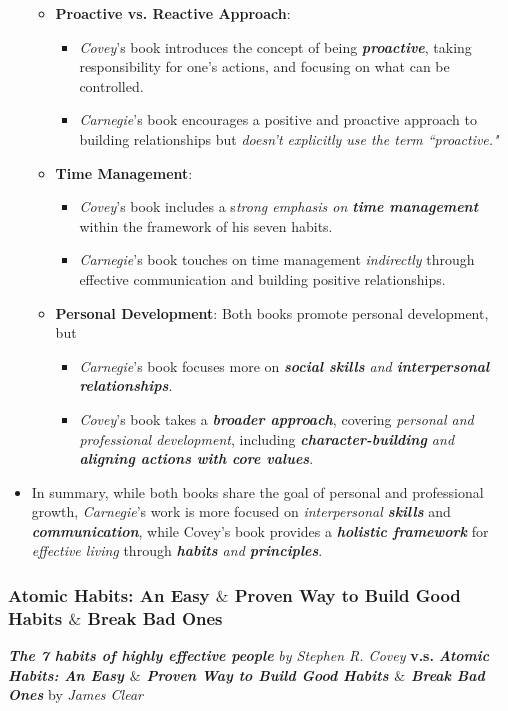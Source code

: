 \documentclass[11pt]{article}
\begin{document}
\begin{itemize}
\begin{itemize}
\item \textbf{Proactive vs. Reactive Approach}:
\begin{itemize}
\item \emph{Covey}'s book introduces the concept of being \emph{\textbf{proactive}}, taking responsibility for one's actions, and focusing on what can be controlled.
\item \emph{Carnegie}'s book encourages a positive and proactive approach to building relationships but \emph{doesn't explicitly use the term ``proactive."}
\end{itemize}

\item \textbf{Time Management}:
\begin{itemize}
\item \emph{Covey}'s book includes a s\emph{trong emphasis on \textbf{time management}} within the framework of his seven habits.
\item \emph{Carnegie}'s book touches on time management \emph{indirectly} through effective communication and building positive relationships.
\end{itemize}

\item \textbf{Personal Development}: Both books promote personal development, but 
\begin{itemize}
\item \emph{Carnegie}'s book focuses more on \emph{\textbf{social skills} and \textbf{interpersonal relationships}}.
\item \emph{Covey}'s book takes a \emph{\textbf{broader approach}}, covering \emph{personal and professional development}, including \emph{\textbf{character-building} and \textbf{aligning actions with core values}}.
\end{itemize}
\end{itemize}

\item In summary, while both books share the goal of personal and professional growth, \emph{Carnegie}'s work is more focused on \emph{interpersonal \textbf{skills}} and \emph{\textbf{communication}}, while Covey's book provides a \emph{\textbf{holistic framework}} for \emph{effective living} through \emph{\textbf{habits} and \textbf{principles}}.
\end{itemize}

\subsubsection{Atomic Habits: An Easy $\&$ Proven Way to Build Good Habits $\&$ Break Bad Ones}
\emph{\textbf{The 7 habits of highly effective people}} \emph{by Stephen R. Covey} \textbf{v.s.} \emph{\textbf{Atomic Habits: An Easy $\&$ Proven Way to Build Good Habits $\&$ Break Bad Ones}} by \emph{James Clear} 
\end{document}
